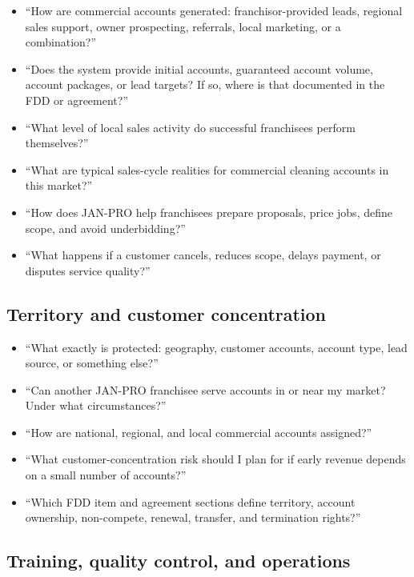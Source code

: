 \documentclass[11pt]{article}
\newcommand{\janpro}{JAN-PRO}
\begin{document}
\begin{itemize}
  \item ``How are commercial accounts generated: franchisor-provided leads, regional sales support, owner prospecting, referrals, local marketing, or a combination?''
  \item ``Does the system provide initial accounts, guaranteed account volume, account packages, or lead targets? If so, where is that documented in the FDD or agreement?''
  \item ``What level of local sales activity do successful franchisees perform themselves?''
  \item ``What are typical sales-cycle realities for commercial cleaning accounts in this market?''
  \item ``How does \janpro{} help franchisees prepare proposals, price jobs, define scope, and avoid underbidding?''
  \item ``What happens if a customer cancels, reduces scope, delays payment, or disputes service quality?''
\end{itemize}

\subsection{Territory and customer concentration}

\begin{itemize}
  \item ``What exactly is protected: geography, customer accounts, account type, lead source, or something else?''
  \item ``Can another \janpro{} franchisee serve accounts in or near my market? Under what circumstances?''
  \item ``How are national, regional, and local commercial accounts assigned?''
  \item ``What customer-concentration risk should I plan for if early revenue depends on a small number of accounts?''
  \item ``Which FDD item and agreement sections define territory, account ownership, non-compete, renewal, transfer, and termination rights?''
\end{itemize}

\subsection{Training, quality control, and operations}
\end{document}
